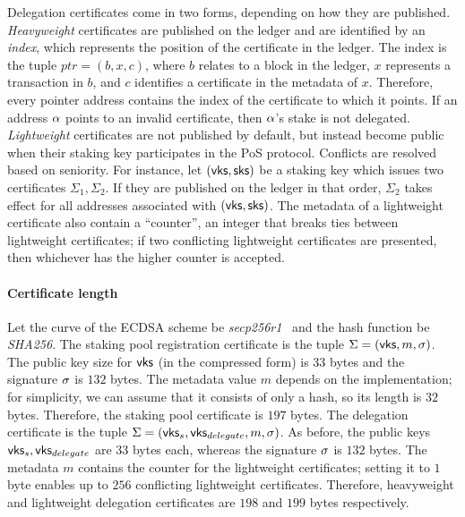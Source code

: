 Delegation certificates come in two forms, depending on how they are published.
\emph{Heavyweight} certificates are published on the ledger and are identified
by an \emph{index}, which represents the position of the certificate in the
ledger. The index is the tuple $ptr = (b, x, c)$, where $b$ relates to a block
in the ledger, $x$ represents a transaction in $b$, and $c$ identifies a
certificate in the metadata of $x$. Therefore, every pointer address contains
the index of the certificate to which it points. If an address $\alpha$ points
to an invalid certificate, then $\alpha$'s stake is not delegated.
\emph{Lightweight} certificates are not published by default, but instead
become public when their staking key participates in the PoS protocol.
Conflicts are resolved based on seniority. For instance, let $(\mathsf{vks}, \mathsf{sks})$
be a staking key which issues two certificates $\Sigma_1, \Sigma_2$. If they
are published on the ledger in that order, $\Sigma_2$ takes effect for all
addresses associated with $(\mathsf{vks}, \mathsf{sks})$. The metadata of a lightweight
certificate also contain a ``counter'', \ie an integer that breaks ties between
lightweight certificates; if two conflicting lightweight certificates are
presented, then whichever has the higher counter is accepted.

\paragraph{Certificate length}\label{sec:certificate-evaluation}
Let the curve of the ECDSA scheme be
\emph{secp256r1}~\cite{gupta2004ecc} and the hash function be \emph{SHA256}.
The staking pool registration certificate is the tuple $\Sigma =
(\mathsf{vks}, m, \sigma)$. The public key size for $\mathsf{vks}$ (in
the compressed form) is $33$ bytes and the signature $\sigma$ is $132$ bytes.
The metadata value $m$ depends on the implementation; for simplicity, we can
assume that it consists of only a hash, so its length is $32$ bytes. Therefore,
the staking pool certificate is $197$ bytes. The delegation certificate is the
tuple $\Sigma = (\mathsf{vks}_s, \mathsf{vks}_{delegate}, m, \sigma)$.
As before, the public keys $\mathsf{vks}_s, \mathsf{vks}_{delegate}$
are $33$ bytes each, whereas the signature $\sigma$ is $132$ bytes. The metadata
$m$ contains the counter for the lightweight certificates; setting it to $1$
byte enables up to $256$ conflicting lightweight certificates. Therefore,
heavyweight and lightweight delegation certificates are $198$ and $199$ bytes
respectively.

